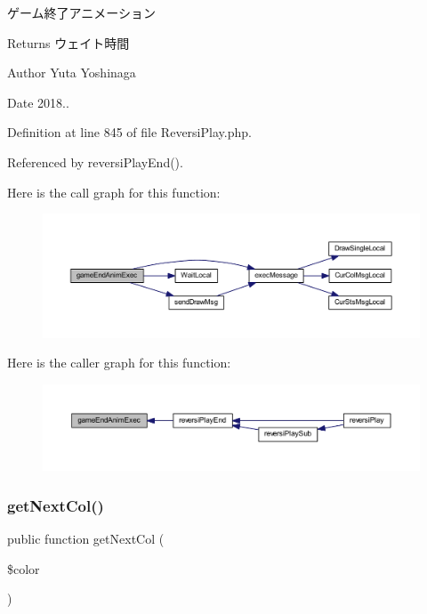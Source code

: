 ゲーム終了アニメーション 

\begin{DoxyReturn}{Returns}
ウェイト時間 
\end{DoxyReturn}
\begin{DoxyAuthor}{Author}
Yuta Yoshinaga 
\end{DoxyAuthor}
\begin{DoxyDate}{Date}
2018.. 
\end{DoxyDate}


Definition at line 845 of file Reversi\+Play.\+php.



Referenced by reversi\+Play\+End().

Here is the call graph for this function\+:
\nopagebreak
\begin{figure}[H]
\begin{center}
\leavevmode
\includegraphics[width=350pt]{class_reversi_play_acbcd366da8242203ae52fb685fbc929e_cgraph}
\end{center}
\end{figure}
Here is the caller graph for this function\+:
\nopagebreak
\begin{figure}[H]
\begin{center}
\leavevmode
\includegraphics[width=350pt]{class_reversi_play_acbcd366da8242203ae52fb685fbc929e_icgraph}
\end{center}
\end{figure}
\mbox{\label{class_reversi_play_a26fd2d7723695b69cbfde7e16b55b096}} 
\subsubsection{\texorpdfstring{get\+Next\+Col()}{getNextCol()}}
{\footnotesize\ttfamily public function get\+Next\+Col (\begin{DoxyParamCaption}\item[{}]{\$color }\end{DoxyParamCaption})}



